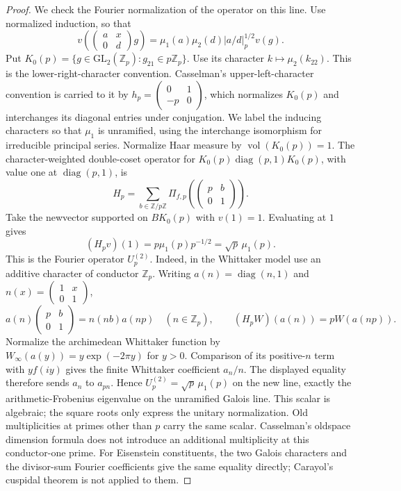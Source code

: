 \documentclass[11pt]{article}
\theoremstyle{definition}
\theoremstyle{remark}
\newcommand{\Z}{\mathbb Z}
\begin{document}
\begin{proof}
We check the Fourier normalization of the operator on this line.
Use normalized induction, so that
\[
 v\left(\begin{pmatrix}a&x\\0&d\end{pmatrix}g\right)
 =\mu_1(a)\mu_2(d)|a/d|_p^{1/2}v(g).
\]
Put $K_0(p)=\{g\in\mathrm{GL}_2(\Z_p):g_{21}\in p\Z_p\}$.
Use its character $k\mapsto\mu_2(k_{22})$.
This is the lower-right-character convention. Casselman's
upper-left-character convention is carried to it by
$h_p=\left(\begin{smallmatrix}0&1\\-p&0\end{smallmatrix}\right)$,
which normalizes $K_0(p)$ and interchanges its diagonal entries
under conjugation. We label the inducing characters so that
$\mu_1$ is unramified, using the interchange isomorphism for
irreducible principal series.
Normalize Haar measure by $\operatorname{vol}(K_0(p))=1$.
The character-weighted double-coset operator for
$K_0(p)\operatorname{diag}(p,1)K_0(p)$, with value one at
$\operatorname{diag}(p,1)$, is
\[
 H_p=\sum_{b\in\Z/p\Z}
       \Pi_{f,p}\left(\begin{pmatrix}p&b\\0&1\end{pmatrix}\right).
\]
Take the newvector supported on $B K_0(p)$ with $v(1)=1$.
Evaluating at $1$ gives
\[
 (H_pv)(1)=p\mu_1(p)p^{-1/2}=\sqrt p\,\mu_1(p).
\]
This is the Fourier operator $U_p^{(2)}$. Indeed, in the
Whittaker model use an additive character of conductor $\Z_p$.
Writing $a(n)=\operatorname{diag}(n,1)$ and
$n(x)=\left(\begin{smallmatrix}1&x\\0&1\end{smallmatrix}\right)$,
\[
 a(n)\begin{pmatrix}p&b\\0&1\end{pmatrix}=n(nb)a(np)
 \quad(n\in\Z_p),\qquad
 (H_pW)(a(n))=pW(a(np)).
\]
Normalize the archimedean Whittaker function by
$W_\infty(a(y))=y\exp(-2\pi y)$ for $y>0$.
Comparison of its positive-$n$ term with $y f(iy)$ gives the
finite Whittaker coefficient $a_n/n$. The displayed equality
therefore sends $a_n$ to $a_{pn}$. Hence
$U_p^{(2)}=\sqrt p\,\mu_1(p)$ on the new line, exactly the
arithmetic-Frobenius eigenvalue on the unramified Galois line.
This scalar is algebraic; the square roots only express the
unitary normalization. Old multiplicities at primes other than
$p$ carry the same scalar. Casselman's oldspace dimension formula
\cite[Corollary, p.~306, and Theorem~4, p.~313]{casselman}
does not introduce an additional multiplicity at this conductor-one
prime. For Eisenstein constituents, the two Galois characters and
the divisor-sum Fourier coefficients give the same equality directly;
Carayol's cuspidal theorem is not applied to them.


\end{proof}
\end{document}
